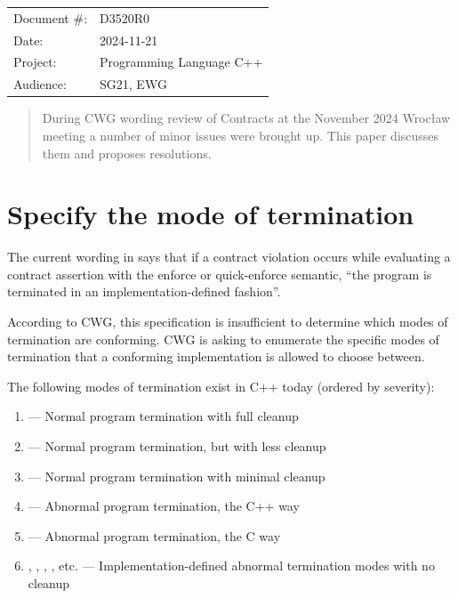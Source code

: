 \begin{tabular}{ll}
Document \#: & D3520R0 \\
Date: &2024-11-21 \\
Project: & Programming Language C++ \\
Audience: & SG21, EWG
\end{tabular}

\begin{abstract}
During CWG wording review of Contracts \cite{P2900R11} at the November 2024 Wroc\l aw meeting a number of minor issues were brought up. This paper discusses them and proposes resolutions.
\end{abstract}







\section{Specify the mode of termination}

The current wording in \cite{P2900R11} says that if a contract violation occurs while evaluating a contract assertion with the enforce or quick-enforce semantic, ``the program is terminated in an implementation-defined fashion''.

According to CWG, this specification is insufficient to determine which modes of termination are conforming. CWG is asking to enumerate the specific modes of termination that a conforming implementation is allowed to choose between.

The following modes of termination exist in C++ today (ordered by severity):

\begin{enumerate}
\item {} --- Normal program termination with full cleanup
\item {} --- Normal program termination, but with less cleanup
\item {} --- Normal program termination with minimal cleanup
\item {} --- Abnormal program termination, the C++ way
\item {} --- Abnormal program termination, the C way
\item {}, , , , etc. --- Implementation-defined abnormal termination modes with no cleanup
\end{enumerate}

